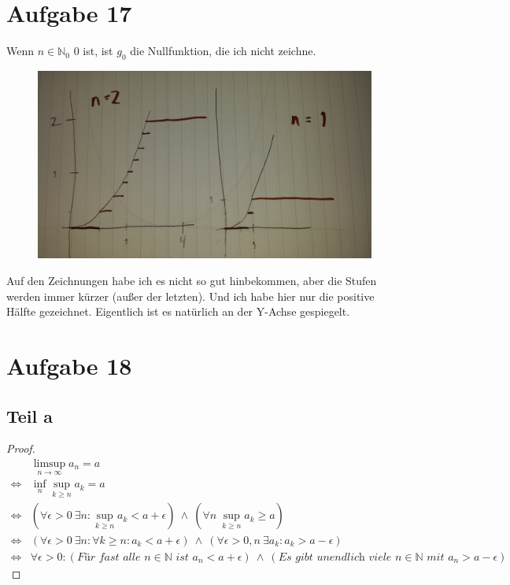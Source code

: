 \documentclass[10pt,a4paper]{article}
\begin{document}
\section{Aufgabe 17}
Wenn $n \in \mathbb{N}_{0}$ 0 ist, ist $g_{0}$ die Nullfunktion, die ich nicht zeichne.
\begin{figure}[H]
  \includegraphics[width=400pt]{5_1}
\end{figure}
Auf den Zeichnungen habe ich es nicht so gut hinbekommen, aber die Stufen werden immer kürzer (außer der letzten).
Und ich habe hier nur die positive Hälfte gezeichnet.
Eigentlich ist es natürlich an der Y-Achse gespiegelt.

\section{Aufgabe 18}

\subsection{Teil a}
\begin{proof}
  \begin{align*}
    & \limsup_{n \rightarrow \infty} a_{n} = a\\
    \Leftrightarrow & \inf_{n} \sup_{k \ge n} a_{k} = a\\
    \Leftrightarrow & (\forall \epsilon > 0\ \exists n : \sup_{k \ge n} a_{k} < a + \epsilon)\ \land\ (\forall n\ \sup_{k \ge n} a_{k} \ge a)\\
    \Leftrightarrow & (\forall \epsilon > 0\ \exists n : \forall k \ge n : a_{k} < a + \epsilon)\ \land\ (\forall \epsilon > 0, n\ \exists a_{k} : a_{k} > a - \epsilon)\\
    \Leftrightarrow & \forall \epsilon > 0 : (\textit{Für fast alle $n \in \mathbb{N}$ ist $a_{n} < a + \epsilon$})\ \land\ (\textit{Es gibt unendlich viele $n \in \mathbb{N}$ mit $a_{n} > a - \epsilon$})
  \end{align*}  
\end{proof}
\end{document}
